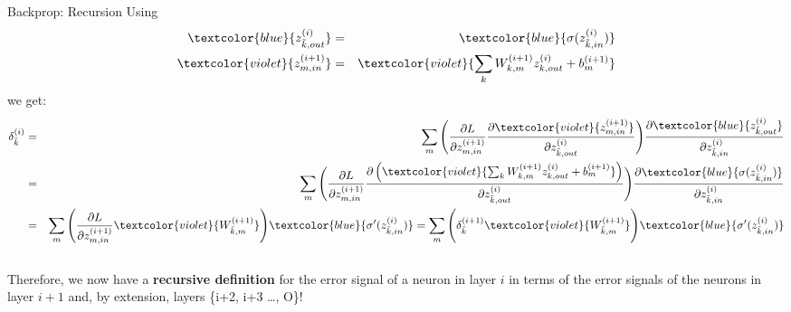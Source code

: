\documentclass[11pt,compress,t,notes=noshow, xcolor=table]{beamer}
\begin{document}
\begin{frame} {Backprop: Recursion}
 Using 
 \vspace*{-5mm}
        {\footnotesize \begin{eqnarray*}
          \textcolor{blue}{z_{\tilde{k},out}^{(i)}} &=& \textcolor{blue}{\sigma(z_{\tilde{k},in}^{(i)})} \\
          \textcolor{violet}{z_{m,in}^{(i+1)}} &=& \textcolor{violet}{\sum_k W_{k,m}^{(i+1)}z_{k,out}^{(i)} + b_m^{(i+1)}}
        \end{eqnarray*}}
we get: 
      \vspace{-0.2cm}
      {\footnotesize \begin{eqnarray*}
      \delta_{\tilde{k}}^{(i)} &=& \sum_m \Bigg( \frac{\partial L}{\partial z_{m,in}^{(i+1)}} \frac{\partial \textcolor{violet}{z_{m,in}^{(i+1)}}}{\partial z_{\tilde{k},out}^{(i)}} \Bigg) \frac{\partial \textcolor{blue}{z_{\tilde{k},out}^{(i)}}}{\partial z_{\tilde{k},in}^{(i)}}  \\
       &=& \sum_m \Bigg( \frac{\partial L}{\partial z_{m,in}^{(i+1)}} \frac{\partial \left(\textcolor{violet}{\sum_k W_{k,m}^{(i+1)}z_{k,out}^{(i)} + b_m^{(i+1)}}\right)}{\partial z_{\tilde{k},out}^{(i)}} \Bigg) \frac{\partial \textcolor{blue}{\sigma(z_{\tilde{k},in}^{(i)})}}{\partial z_{\tilde{k},in}^{(i)}}  \\
      &=& \sum_m \Bigg( \frac{\partial L}{\partial z_{m,in}^{(i+1)}} \textcolor{violet}{W_{\tilde{k},m}^{(i+1)}} \Bigg) \textcolor{blue}{\sigma'(z_{\tilde{k},in}^{(i)})} = \sum_m \Bigg(  \delta_{\tilde{k}}^{(i+1)} \textcolor{violet}{W_{\tilde{k},m}^{(i+1)}} \Bigg) \textcolor{blue}{\sigma'(z_{\tilde{k},in}^{(i)})} 
      \end{eqnarray*}}\\
      Therefore, we now have a \textbf{recursive definition} for the error signal of a neuron in layer $i$ in terms of the error signals of the neurons in layer $i+1$ and, by extension, layers \{i+2, i+3 \ldots , O\}!
\end{frame}
\end{document}
